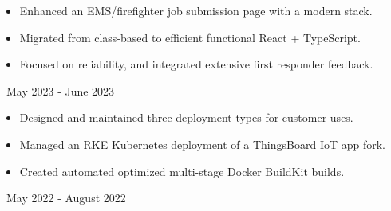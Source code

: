\documentclass[11pt,letterpaper,ragged2e]{altacv}
\begin{document}

\hfuzz=5pt %

\begin{fullwidth}
	\makecvheader
\end{fullwidth}




{
	\begin{itemize}
		\item Enhanced an EMS/firefighter job submission page with a modern stack.
		\item Migrated from class-based to efficient functional React + TypeScript.
		\item Focused on reliability, and integrated extensive first responder feedback.
	\end{itemize}
}
{\faCalendar\, May 2023 - June 2023}
{
}

{
	\begin{itemize}
		\item Designed and maintained three deployment types for customer uses.
		\item Managed an RKE Kubernetes deployment of a ThingsBoard IoT app fork.
		\item Created automated optimized multi-stage Docker BuildKit builds.
	\end{itemize}
}
{\faCalendar\, May 2022 - August 2022}
{
}
\end{document}
